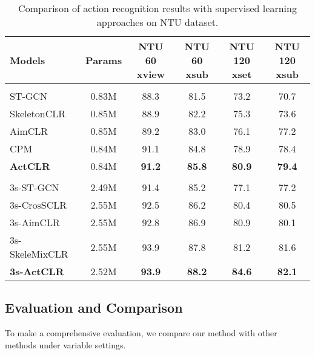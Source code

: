 \documentclass[twocolumn]{article}
\begin{document}
\begin{table*}[tb]
    \small
    \centering
    \caption{Comparison of action recognition results with supervised learning approaches on NTU dataset.}
    \begin{tabular}{l|c|c|c|c|c}
      \toprule
     Models&Params&NTU 60 xview&NTU 60 xsub&NTU 120 xset&NTU 120 xsub\\
      \midrule
      \rowcolor{gray!10} \multicolumn{6}{l}{\textit{Single-stream:}}\\
ST-GCN~\cite{yan2018spatial} & 0.83M & 88.3 & 81.5 & 73.2 & 70.7 \\
      SkeletonCLR~\cite{li20213d} & 0.85M & 88.9 & 82.2 & 75.3 & 73.6\\
      AimCLR~\cite{guo2021contrastive} & 0.85M & 89.2 & 83.0 & 76.1 & 77.2\\
      CPM~\cite{zhang2022contrastive} & 0.84M & 91.1 & 84.8 & 78.9 & 78.4\\
\textbf{ActCLR} & 0.84M & \textbf{91.2} &\textbf{85.8}&\textbf{80.9}& \textbf{79.4}\\
      \midrule
      \rowcolor{gray!10} \multicolumn{6}{l}{\textit{Three-stream:}}\\
      3s-ST-GCN~\cite{yan2018spatial} & 2.49M & 91.4 & 85.2 & 77.1 & 77.2 \\
      3s-CrosSCLR~\cite{li20213d}& 2.55M & 92.5 & 86.2 & 80.4 & 80.5 \\
      3s-AimCLR~\cite{guo2021contrastive}& 2.55M & 92.8 & 86.9 & 80.9 & 80.1\\
      3s-SkeleMixCLR~\cite{chen2022contrastive}& 2.55M & 93.9 & 87.8 & 81.2 & 81.6\\
\textbf{3s-ActCLR} & 2.52M & \textbf{93.9} &\textbf{88.2}&\textbf{84.6}& \textbf{82.1}\\
      \bottomrule
  \end{tabular}
    \label{tab:supervised_ntu}
  \end{table*}

\subsection{Evaluation and Comparison}
To make a comprehensive evaluation, we compare our method with other methods under variable settings.
\vspace{1mm}
\end{document}
